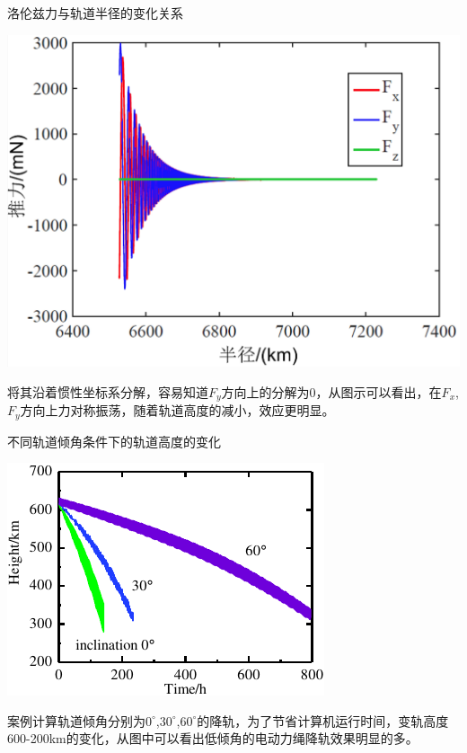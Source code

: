 \documentclass[sectioncirclenumberstyle]{le2iutbmbeamer}
\begin{document}
\begin{frame}{洛伦兹力与轨道半径的变化关系}
\begin{minipage}{0.6\textwidth}
\begin{center}
\includegraphics[width=\linewidth]{figures/tf}
\end{center}
\end{minipage}%
\begin{minipage}{0.4\textwidth}
将其沿着惯性坐标系分解，容易知道$F_y$方向上的分解为0，从图示可以看出，在$F_x$,$F_y$方向上力对称振荡，随着轨道高度的减小，效应更明显。
\end{minipage}%
\end{frame}

\begin{frame}{不同轨道倾角条件下的轨道高度的变化}
\begin{minipage}{0.6\textwidth}

\begin{center}
\includegraphics[width=\linewidth]{figures/th}
\end{center}
\end{minipage}%
\begin{minipage}{0.4\textwidth}
案例计算轨道倾角分别为$0^\circ$,$30^\circ$,$60^\circ$的降轨，为了节省计算机运行时间，变轨高度600-200km的变化，从图中可以看出低倾角的电动力绳降轨效果明显的多。
\end{minipage}
\end{frame}
\end{document}
